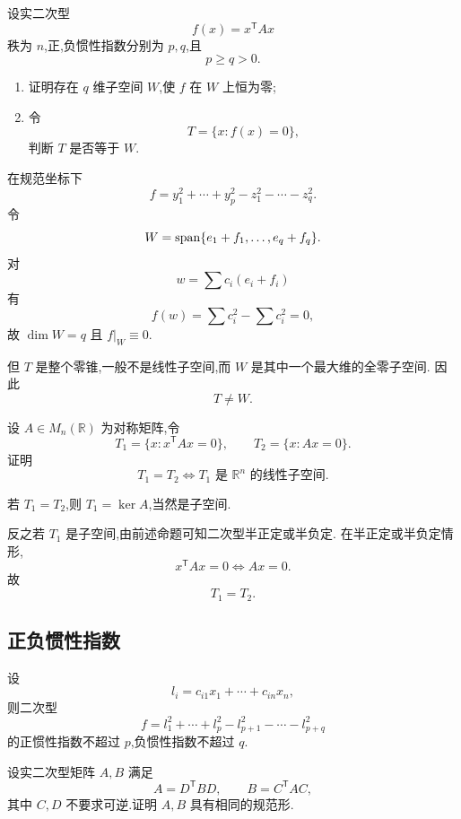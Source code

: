\begin{example}
设实二次型
\[
f(x)=x^{\mathsf T}Ax
\]
秩为 $n$,正,负惯性指数分别为 $p,q$,且
\[
p\ge q>0.
\]
\begin{enumerate}
    \item 证明存在 $q$ 维子空间 $W$,使 $f$ 在 $W$ 上恒为零;
    \item 令
    \[
    T=\{x:f(x)=0\},
    \]
    判断 $T$ 是否等于 $W$.
\end{enumerate}
\end{example}
\exampleblank

\begin{solution}
在规范坐标下
\[
f=
y_1^2+\cdots+y_p^2
-z_1^2-\cdots-z_q^2.
\]
令
\[
W=\operatorname{span}\{e_1+f_1,\ldots,e_q+f_q\}.
\]
对
\[
w=\sum c_i(e_i+f_i)
\]
有
\[
f(w)=\sum c_i^2-\sum c_i^2=0,
\]
故 $\dim W=q$ 且 $f|_W\equiv0$.

但 $T$ 是整个零锥,一般不是线性子空间,而 $W$ 是其中一个最大维的全零子空间.
因此
\[
\boxed{T\neq W}.
\]
\end{solution}


\begin{example}
设 $A\in M_n(\mathbb{R})$ 为对称矩阵,令
\[
T_1=\{x:x^{\mathsf T}Ax=0\},
\qquad
T_2=\{x:Ax=0\}.
\]
证明
\[
T_1=T_2
\iff
T_1\text{ 是 }\mathbb{R}^n\text{ 的线性子空间}.
\]
\end{example}
\exampleblank

\begin{solution}
若 $T_1=T_2$,则 $T_1=\ker A$,当然是子空间.

反之若 $T_1$ 是子空间,由前述命题可知二次型半正定或半负定.
在半正定或半负定情形,
\[
x^{\mathsf T}Ax=0
\iff
Ax=0.
\]
故
\[
T_1=T_2.
\]
\end{solution}


\subsection{正负惯性指数}

\begin{proposition}[\markstar]
设
\[
l_i=c_{i1}x_1+\cdots+c_{in}x_n,
\]
则二次型
\[
f=l_1^2+\cdots+l_p^2-l_{p+1}^2-\cdots-l_{p+q}^2
\]
的正惯性指数不超过 $p$,负惯性指数不超过 $q$.
\end{proposition}


\begin{example}
设实二次型矩阵 $A,B$ 满足
\[
A=D^{\mathsf T}BD,
\qquad
B=C^{\mathsf T}AC,
\]
其中 $C,D$ 不要求可逆.证明 $A,B$ 具有相同的规范形.
\end{example}
\exampleblank

